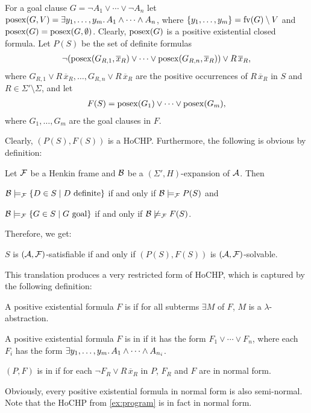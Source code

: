 \documentclass[a4paper,twoside,notitlepage,openright,11pt]{report}
\begin{document}
For a goal clause $G=\neg A_1\lor\cdots\lor\neg A_n$ let $\operatorname{posex}(G,V)=\exists y_1,\ldots,y_m\ldotp A_1\land\cdots\land A_n$, where $\{y_1,\ldots,y_m\}=\operatorname{fv}(G)\setminus V$ and $\operatorname{posex}(G)=\operatorname{posex}(G,\emptyset)$. Clearly, $\operatorname{posex}(G)$ is a positive existential closed formula.
Let $P(S)$ be the set of definite formulas
\begin{align*}
  \neg (\operatorname{posex}(G_{R,1},\overline x_R)\lor\cdots\lor \operatorname{posex}(G_{R,n},\overline x_R))\lor R\,\overline x_R,
\end{align*}
where $G_{R,1}\lor R\,\overline x_R,\ldots,G_{R,n}\lor R\,\overline x_R$ are the positive occurrences of $R\,\overline x_R$ in $S$ and $R\in\Sigma'\setminus\Sigma$, and let
\begin{align*}
  F(S)=\operatorname{posex}(G_1)\lor\cdots\lor\operatorname{posex}(G_m),
\end{align*}
where $G_1,\ldots,G_m$ are the goal clauses in $F$.

Clearly, $(P(S),F(S))$ is a HoCHP. Furthermore, the following is obvious by definition:
\begin{lemma}
  Let $\mathcal F$ be a Henkin frame and $\mathcal B$ be a $(\Sigma',H)$-expansion of $\mathcal A$. Then
  \begin{thmlist}
  \item\label{lem:nfdefinite} $\mathcal B\models_\mathcal F\{D\in S\mid D\text{ definite}\}$ if and only if $\mathcal B\models_\mathcal F P(S)$ and
  \item $\mathcal B\models_\mathcal F\{G\in S\mid G\text{ goal}\}$ if and only if $\mathcal B\not\models_\mathcal F F(S)$.
  \end{thmlist}
\end{lemma}
Therefore, we get:
\begin{corollary}
  \label{lem:assocprgmnew} $S$ is $(\mathcal A,\mathcal F)$-satisfiable if and only if $(P(S),F(S))$ is $(\mathcal A,\mathcal F)$-solvable.
\end{corollary}
This translation produces a very restricted form of HoCHP, which is captured by the following definition:
\begin{definition}
  \begin{thmlist}
  \item A positive existential formula $F$ is  if for all subterms $\exists M$ of $F$, $M$ is a $\lambda$-abstraction.
  \item A positive existential formula $F$ is in  if it has the form $F_1\lor\cdots\lor F_n$, where each $F_i$ has the form $\exists y_1,\ldots,y_m\ldotp A_1\land\cdots\land A_{n_i}$.
  \item $(P,F)$ is in  if for each $\neg F_R\lor R\,\overline x_R$ in $P$, $F_R$ and $F$ are in normal form.
  \end{thmlist}
\end{definition}
Obviously, every positive existential formula in normal form is also semi-normal.
Note that the HoCHP from \cref{ex:program} is in fact in normal form.
\end{document}
